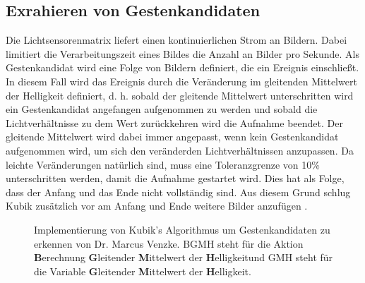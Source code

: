 \subsection{Exrahieren von Gestenkandidaten}
\label{sec:gesture_extraction}
Die Lichtsensorenmatrix liefert einen kontinuierlichen Strom an Bildern. Dabei limitiert die Verarbeitungszeit eines Bildes die Anzahl an Bilder pro Sekunde. Als Gestenkandidat wird eine Folge von Bildern definiert, die
ein Ereignis einschließt. In diesem Fall wird das Ereignis durch die Veränderung im gleitenden Mittelwert der Helligkeit definiert, d. h. sobald der gleitende Mittelwert unterschritten wird ein Gestenkandidat
angefangen aufgenommen zu werden und sobald die Lichtverhältnisse zu dem Wert zurückkehren wird die Aufnahme beendet. Der gleitende Mittelwert wird dabei immer angepasst, wenn kein Gestenkandidat aufgenommen wird, um
sich den veränderden Lichtverhältnissen anzupassen. Da leichte Veränderungen natürlich sind, muss eine Toleranzgrenze von 10\% unterschritten werden, damit die Aufnahme gestartet wird. Dies hat als Folge, dass der Anfang
und das Ende nicht vollständig sind. Aus diesem Grund schlug Kubik zusätzlich vor am Anfang und Ende weitere Bilder anzufügen \cite{kubikThesis}.
\begin{figure}
    \usetikzlibrary{arrows,automata,positioning}
    \centering
    \caption{Implementierung von Kubik's Algorithmus um Gestenkandidaten zu erkennen von Dr. Marcus Venzke. BGMH steht für die Aktion \glqq \textbf{B}erechnung \textbf{G}leitender \textbf{M}ittelwert der \textbf{H}elligkeit\grqq und GMH steht für die Variable \glqq \textbf{G}leitender \textbf{M}ittelwert der \textbf{H}elligkeit\grqq.}
    \label{fig:venzkeAlgoImpl}
\end{figure}
